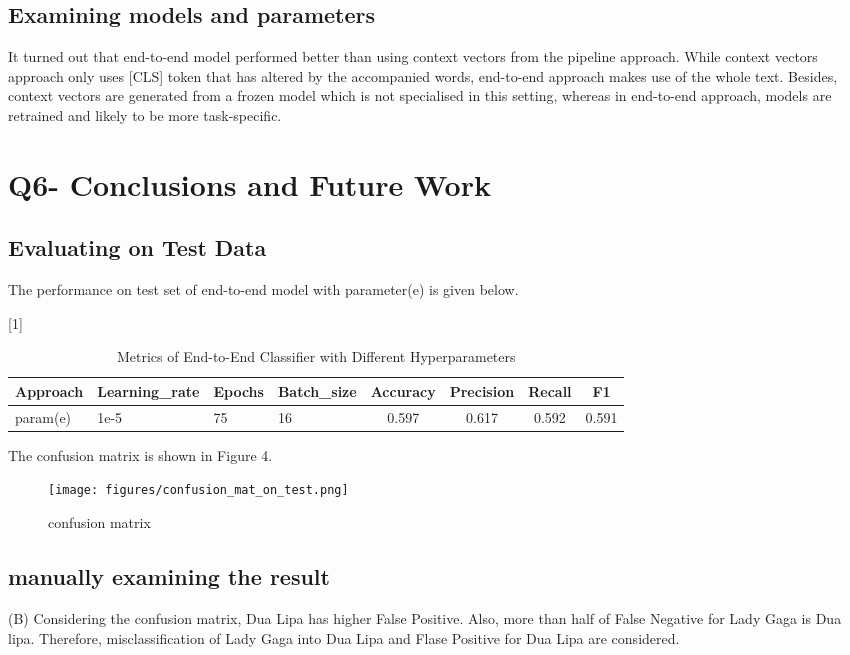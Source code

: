 \documentclass[a4paper,11pt]{article}
\begin{document}
\subsection{Examining models and parameters}
It turned out that end-to-end model performed better than using context vectors from the pipeline approach.
While context vectors approach only uses [CLS] token that has altered by the accompanied words,
end-to-end approach makes use of the whole text.
Besides, context vectors are generated from a frozen model which is not specialised in this setting,
whereas in end-to-end approach, models are retrained and likely to be more task-specific.


\section{Q6- Conclusions and Future Work}
\subsection{Evaluating on Test Data}
The performance on test set of end-to-end model with parameter(e) is given below.
\begin{table}[htbp]
    \caption{Metrics of End-to-End Classifier with Different Hyperparameters}
    \small
    \scalebox{1}[1]{
    \begin{tabular}{l|lll|cccc}
         Approach & Learning\_rate & Epochs & Batch\_size & Accuracy & Precision & Recall & F1 \\ \hline 
         param(e)                  & 1e-5& 75& 16  & 0.597 & 0.617 & 0.592  & 0.591 \\
    \end{tabular}
    }
\end{table}

The confusion matrix is shown in Figure 4.
\begin{figure}[htbp]
  \begin{center}
  \texttt{[image: figures/confusion\_mat\_on\_test.png]}
  \caption{confusion matrix}
  \end{center}
\end{figure}

\subsection{manually examining the result}
(B)
Considering the confusion matrix, Dua Lipa has higher False Positive.
Also, more than half of False Negative for Lady Gaga is Dua lipa.
Therefore, misclassification of Lady Gaga into Dua Lipa and Flase Positive for Dua Lipa are considered.
\end{document}
